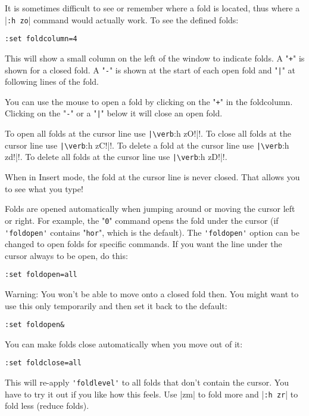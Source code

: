 It is sometimes difficult to see or remember where a fold is located, thus where a |\verb!:h zo!| command would actually work.
To see the defined folds:

\begin{Verbatim}[samepage=true]
 :set foldcolumn=4
\end{Verbatim}

This will show a small column on the left of the window to indicate folds.
A "\verb!+!" is shown for a closed fold.
A "\verb!-!" is shown at the start of each open fold and "\verb!|!" at following lines of the fold.

You can use the mouse to open a fold by clicking on the "\verb!+!" in the foldcolumn.
Clicking on the "\verb!-!" or a "\verb!|!" below it will close an open fold.

To open all folds at the cursor line use \verb!|\verb!:h zO!|!.
To close all folds at the cursor line use \verb!|\verb!:h zC!|!.
To delete a fold at the cursor line use \verb!|\verb!:h zd!|!.
To delete all folds at the cursor line use \verb!|\verb!:h zD!|!.

When in Insert mode, the fold at the cursor line is never closed.
That allows you to see what you type!

Folds are opened automatically when jumping around or moving the cursor left or right.
For example, the "\verb!0!" command opens the fold under the cursor (if \verb!'foldopen'! contains "\verb!hor!", which is the default).
The \verb!'foldopen'! option can be changed to open folds for specific commands.
If you want the line under the cursor always to be open, do this:

\begin{Verbatim}[samepage=true]
 :set foldopen=all
\end{Verbatim}

Warning: You won't be able to move onto a closed fold then.
You might want to use this only temporarily and then set it back to the default:

\begin{Verbatim}[samepage=true]
 :set foldopen&
\end{Verbatim}

You can make folds close automatically when you move out of it:

\begin{Verbatim}[samepage=true]
 :set foldclose=all
\end{Verbatim}

This will re-apply \verb!'foldlevel'! to all folds that don't contain the cursor.
You have to try it out if you like how this feels.
Use |zm| to fold more and |\verb!:h zr!| to fold less (reduce folds).

